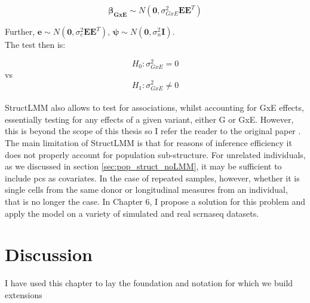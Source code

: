 \begin{equation}\label{eq:StructLMM-int_beta_GxE}
    \boldsymbol{\beta_{GxE}} \sim N(\mathbf{0}, \sigma^2_{GxE}\mathbf{E}\mathbf{E}^T)
\end{equation}

Further, $\mathbf{e} \sim N(\mathbf{0}, \sigma^2_{e}\mathbf{E}\mathbf{E}^T)$, $\boldsymbol{\psi} \sim N(\mathbf{0}, \sigma^2_{n}\mathbf{I})$. \\


The test then is:

\begin{equation}\label{eq:StructLMM-int_H0}
 H_{0}: \sigma^2_{GxE}=0 
\end{equation}
vs
\begin{equation}\label{eq:StructLMM-int_H1}
 H_{1}: \sigma^2_{GxE} \neq 0 
\end{equation}\\

StructLMM also allows to test for associations, whilst accounting for GxE effects, essentially testing for any effects of a given variant, either G or GxE.
However, this is beyond the scope of this thesis so I refer the reader to the original paper \cite{moore2019linear}.\\

The main limitation of StructLMM is that for reasons of inference efficiency it does not properly account for population sub-structure.
For unrelated individuals, as we discussed in section \ref{sec:pop_struct_noLMM}, it may be sufficient to include \gls{pc}s as covariates.
In the case of repeated samples, however, whether it is single cells from the same donor or longitudinal measures from an individual, that is no longer the case.
In Chapter 6, I propose a solution for this problem and apply the model on a variety of simulated and real \gls{scrnaseq} datasets.


\section{Discussion}

I have used this chapter to lay the foundation and notation for which we build extensions 